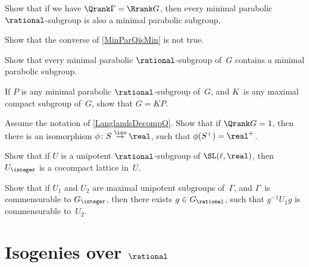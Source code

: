 \begin{exercises}
\item \label{MinParQisMin}
Show that if we have $\Qrank \Gamma = \Rrank G$, then every minimal parabolic $\rational$-subgroup is also a minimal parabolic subgroup. 

\item Show that the converse of \cref{MinParQisMin} is not true.

\item Show that every minimal parabolic $\rational$-subgroup of~$G$ contains a minimal parabolic subgroup.

\item \label{G=KP}
If $P$ is any minimal parabolic $\rational$-subgroup of~$G$, and $K$~is any maximal compact subgroup of~$G$, show that $G = KP$.

\item Assume the notation of \cref{LanglandsDecompQ}. Show that if $\Qrank G = 1$, then there is an isomorphism $\phi \colon S \stackrel{\iso}{\to} \real$, such that $\phi(S^+) = \real^+$.


\item \label{U/UZcpct}
 Show that if $U$ is a unipotent $\rational$-subgroup of $\SL(\ell,\real)$, then $U_{\integer}$ is a cocompact lattice in~$U$.
 
\item Show that if $U_1$ and $U_2$ are maximal unipotent
subgroups of~$\Gamma$, and $\Gamma$~is commensurable to
$G_{\integer}$, then there exists $g \in G_{\rational}$, such
that $g^{-1} U_1 g$ is commensurable to~$U_2$.

\end{exercises}






\section{Isogenies over \texorpdfstring{$\rational$}{Q}}

